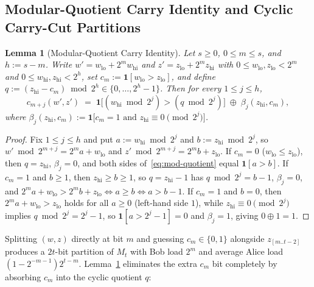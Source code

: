 \documentclass[11pt,reqno]{amsart}
\newtheorem{lemma}[theorem]{Lemma}
\theoremstyle{definition}
\theoremstyle{remark}
\newcommand{\ind}{\mathbf{1}}
\numberwithin{equation}{section}
\begin{document}
\subsection{Modular-Quotient Carry Identity and Cyclic Carry-Cut Partitions}

\begin{lemma}[Modular-Quotient Carry Identity]
  \label{lem:mod-quotient}
  Let $s \ge 0$, $0 \le m \le s$, and $h := s - m$. Write $w' = w_{\mathrm{lo}} + 2^m w_{\mathrm{hi}}$ and $z' = z_{\mathrm{lo}} + 2^m z_{\mathrm{hi}}$ with $0 \le w_{\mathrm{lo}}, z_{\mathrm{lo}} < 2^m$ and $0 \le w_{\mathrm{hi}}, z_{\mathrm{hi}} < 2^h$, set $c_m := \ind[w_{\mathrm{lo}} > z_{\mathrm{lo}}]$, and define $q := (z_{\mathrm{hi}} - c_m) \bmod 2^h \in \{0, \dots, 2^h - 1\}$. Then for every $1 \le j \le h$,
  \begin{equation}
    \label{eq:mod-quotient}
    c_{m+j}(w', z') \;=\; \ind\bigl[(w_{\mathrm{hi}} \bmod 2^j) > (q \bmod 2^j)\bigr] \;\oplus\; \beta_j(z_{\mathrm{hi}}, c_m),
  \end{equation}
  where $\beta_j(z_{\mathrm{hi}}, c_m) := \ind\bigl[c_m = 1 \text{ and } z_{\mathrm{hi}} \equiv 0 \pmod{2^j}\bigr]$.
\end{lemma}

\begin{proof}
Fix $1 \le j \le h$ and put $a := w_{\mathrm{hi}} \bmod 2^j$ and $b := z_{\mathrm{hi}} \bmod 2^j$, so $w' \bmod 2^{m+j} = 2^m a + w_{\mathrm{lo}}$ and $z' \bmod 2^{m+j} = 2^m b + z_{\mathrm{lo}}$. If $c_m = 0$ ($w_{\mathrm{lo}} \le z_{\mathrm{lo}}$), then $q = z_{\mathrm{hi}}$, $\beta_j = 0$, and both sides of~\eqref{eq:mod-quotient} equal $\ind[a > b]$. If $c_m = 1$ and $b \ge 1$, then $z_{\mathrm{hi}} \ge b \ge 1$, so $q = z_{\mathrm{hi}} - 1$ has $q \bmod 2^j = b - 1$, $\beta_j = 0$, and $2^m a + w_{\mathrm{lo}} > 2^m b + z_{\mathrm{lo}} \iff a \ge b \iff a > b - 1$. If $c_m = 1$ and $b = 0$, then $2^m a + w_{\mathrm{lo}} > z_{\mathrm{lo}}$ holds for all $a \ge 0$ (left-hand side $1$), while $z_{\mathrm{hi}} \equiv 0 \pmod{2^j}$ implies $q \bmod 2^j = 2^j - 1$, so $\ind[a > 2^j - 1] = 0$ and $\beta_j = 1$, giving $0 \oplus 1 = 1$.
\end{proof}

Splitting $(w, z)$ directly at bit $m$ and guessing $c_m \in \{0, 1\}$ alongside $z_{[m..t-2]}$ produces a $2t$-bit partition of $M_t$ with Bob load $2^m$ and average Alice load $(1 - 2^{-m-1})2^{t-m}$. Lemma~\ref{lem:mod-quotient} eliminates the extra $c_m$ bit completely by absorbing $c_m$ into the cyclic quotient $q$:
\end{document}
